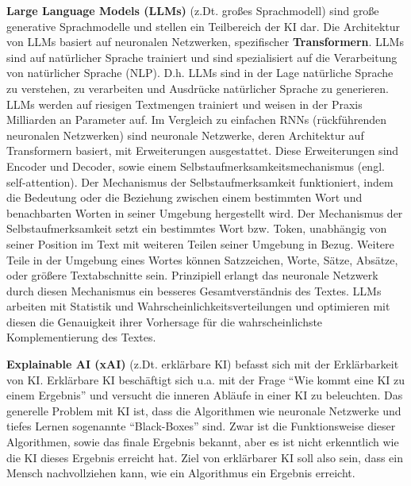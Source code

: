 \textbf{Large Language Models (LLMs)} (z.Dt. großes Sprachmodell) sind große generative Sprachmodelle und stellen ein Teilbereich der KI dar.
Die Architektur von LLMs basiert auf neuronalen Netzwerken, spezifischer \textbf{Transformern}.
LLMs sind auf natürlicher Sprache trainiert und sind spezialisiert auf die Verarbeitung von natürlicher Sprache (NLP).
D.h. LLMs sind in der Lage natürliche Sprache zu verstehen, zu verarbeiten und Ausdrücke natürlicher Sprache zu generieren.
LLMs werden auf riesigen Textmengen trainiert und weisen in der Praxis Milliarden an Parameter auf.
Im Vergleich zu einfachen RNNs (rückführenden neuronalen Netzwerken) sind neuronale Netzwerke, deren Architektur auf Transformern basiert, mit Erweiterungen ausgestattet.
Diese Erweiterungen sind Encoder und Decoder, sowie einem Selbstaufmerksamkeitsmechanismus (engl. self-attention).
Der Mechanismus der Selbstaufmerksamkeit funktioniert, indem die Bedeutung oder die Beziehung zwischen einem bestimmten Wort und benachbarten Worten in seiner Umgebung hergestellt wird.
Der Mechanismus der Selbstaufmerksamkeit setzt ein bestimmtes Wort bzw. Token, unabhängig von seiner Position im Text mit weiteren Teilen seiner Umgebung in Bezug.
Weitere Teile in der Umgebung eines Wortes können Satzzeichen, Worte, Sätze, Absätze, oder größere Textabschnitte sein.
Prinzipiell erlangt das neuronale Netzwerk durch diesen Mechanismus ein besseres Gesamtverständnis des Textes.
LLMs arbeiten mit Statistik und Wahrscheinlichkeitsverteilungen und optimieren mit diesen die Genauigkeit ihrer Vorhersage für die wahrscheinlichste Komplementierung des Textes.

\textbf{Explainable AI (xAI)} (z.Dt. erklärbare KI) befasst sich mit der Erklärbarkeit von KI.
Erklärbare KI beschäftigt sich u.a. mit der Frage \enquote{Wie kommt eine KI zu einem Ergebnis} und versucht die inneren Abläufe in einer KI zu beleuchten.
Das generelle Problem mit KI ist, dass die Algorithmen wie neuronale Netzwerke und tiefes Lernen sogenannte \enquote{Black-Boxes} sind.
Zwar ist die Funktionsweise dieser Algorithmen, sowie das finale Ergebnis bekannt, aber es ist nicht erkenntlich wie die KI dieses Ergebnis erreicht hat.
Ziel von erklärbarer KI soll also sein, dass ein Mensch nachvollziehen kann, wie ein Algorithmus ein Ergebnis erreicht.